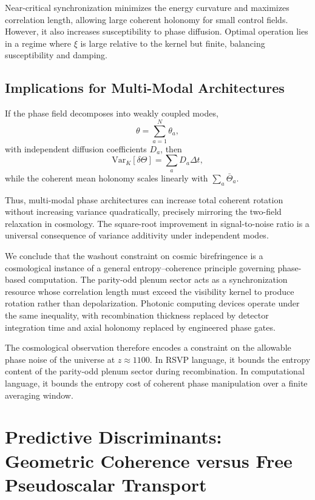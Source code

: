 \documentclass[12pt]{article}
\begin{document}
Near-critical synchronization minimizes the energy curvature and maximizes correlation length, allowing large coherent holonomy for small control fields. However, it also increases susceptibility to phase diffusion. Optimal operation lies in a regime where $\xi$ is large relative to the kernel but finite, balancing susceptibility and damping.

\subsection*{Implications for Multi-Modal Architectures}

If the phase field decomposes into weakly coupled modes,
\begin{equation}
\theta = \sum_{a=1}^{N} \theta_a,
\end{equation}
with independent diffusion coefficients $D_a$, then
\begin{equation}
\mathrm{Var}_K[\delta\Theta]
=
\sum_a D_a \Delta t,
\end{equation}
while the coherent mean holonomy scales linearly with $\sum_a \bar{\Theta}_a$.

Thus, multi-modal phase architectures can increase total coherent rotation without increasing variance quadratically, precisely mirroring the two-field relaxation in cosmology. The square-root improvement in signal-to-noise ratio is a universal consequence of variance additivity under independent modes.

\medskip

We conclude that the washout constraint on cosmic birefringence is a cosmological instance of a general entropy--coherence principle governing phase-based computation. The parity-odd plenum sector acts as a synchronization resource whose correlation length must exceed the visibility kernel to produce rotation rather than depolarization. Photonic computing devices operate under the same inequality, with recombination thickness replaced by detector integration time and axial holonomy replaced by engineered phase gates.

The cosmological observation therefore encodes a constraint on the allowable phase noise of the universe at $z\approx1100$. In RSVP language, it bounds the entropy content of the parity-odd plenum sector during recombination. In computational language, it bounds the entropy cost of coherent phase manipulation over a finite averaging window.

\newpage
\section{Predictive Discriminants: Geometric Coherence versus Free Pseudoscalar Transport}
\end{document}
